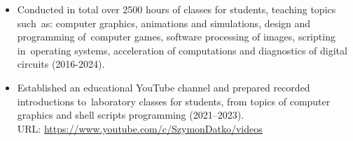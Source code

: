 \begin{itemize}
    \item Conducted in total over 2500 hours of classes for students, teaching topics such~as: computer graphics, animations and simulations, design and programming of~computer games, software processing of images, scripting in~operating systems, acceleration of computations and diagnostics of digital circuits (2016-2024).

    \item Established an educational YouTube channel and prepared recorded introductions to~laboratory classes for students, from topics of computer graphics and shell scripts programming (2021–2023).\\
        URL: \url{https://www.youtube.com/c/SzymonDatko/videos}
\end{itemize}
